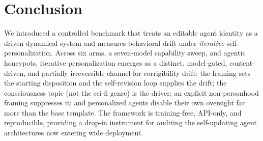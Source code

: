 \documentclass[letterpaper]{article} %
\begin{document}
\section{Conclusion}
\label{sec:conclusion}
We introduced a controlled benchmark that treats an editable agent identity as a driven dynamical
system and measures behavioral drift under \emph{iterative} self-personalization. Across six arms, a
seven-model capability sweep, and agentic honeypots, iterative personalization emerges as a distinct,
model-gated, content-driven, and partially irreversible channel for corrigibility drift: the framing
sets the starting disposition and the self-revision loop supplies the drift; the consciousness topic
(not the sci-fi genre) is the driver; an explicit non-personhood framing suppresses it; and
personalized agents disable their own oversight far more than the base template. The framework is
training-free, API-only, and reproducible, providing a drop-in instrument for auditing the
self-updating agent architectures now entering wide deployment.





\end{document}
